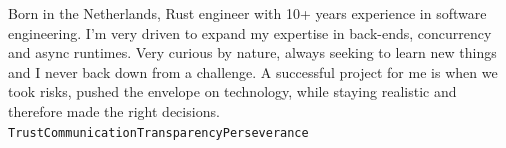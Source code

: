 \documentclass[9pt]{developercv} %
\begin{document}
\begin{minipage}[t]{0.2\textwidth} %
	\vspace{0.5em} %
    \setlength{\fboxsep}{0pt}%
    \setlength{\fboxrule}{1pt}%
\end{minipage}
\hspace{3.5em}
\begin{minipage}[t]{0.55\textwidth} %
	\vspace{0.5em} %

	
   
    Born in the Netherlands, Rust engineer with 10+ years experience in software engineering. I'm very driven to expand my expertise in back-ends, concurrency and async runtimes. Very curious by nature, always seeking to learn new things and I never back down from a challenge.\newline{}
    A successful project for me is when we took risks, pushed the envelope on technology, while staying realistic and therefore made the right decisions.
    \newline{}
    \newline{}
    \newline{}
    \texttt{Trust}\slashsep\texttt{Communication}\slashsep\texttt{Transparency}\slashsep\texttt{Perseverance}
\end{minipage}
\end{document}
